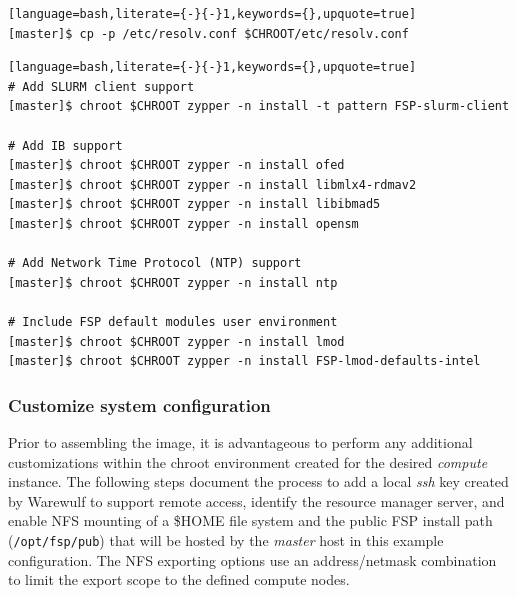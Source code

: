 \documentclass[letterpaper]{article}
\begin{document}
\begin{lstlisting}[language=bash,literate={-}{-}1,keywords={},upquote=true]
[master]$ cp -p /etc/resolv.conf $CHROOT/etc/resolv.conf
\end{lstlisting}


\begin{lstlisting}[language=bash,literate={-}{-}1,keywords={},upquote=true]
# Add SLURM client support
[master]$ chroot $CHROOT zypper -n install -t pattern FSP-slurm-client

# Add IB support
[master]$ chroot $CHROOT zypper -n install ofed
[master]$ chroot $CHROOT zypper -n install libmlx4-rdmav2
[master]$ chroot $CHROOT zypper -n install libibmad5
[master]$ chroot $CHROOT zypper -n install opensm

# Add Network Time Protocol (NTP) support
[master]$ chroot $CHROOT zypper -n install ntp

# Include FSP default modules user environment
[master]$ chroot $CHROOT zypper -n install lmod 
[master]$ chroot $CHROOT zypper -n install FSP-lmod-defaults-intel
\end{lstlisting}


\subsubsection{Customize system configuration} \label{sec:master_customization}

Prior to assembling the image, it is advantageous to perform any additional
customizations within the chroot environment created for the desired {\em
  compute} instance. The following steps document the process to add a local
{\em ssh} key created by Warewulf to support remote access, identify the
resource manager server, and enable NFS mounting of a \$HOME file system and
the public FSP install path (\texttt{/opt/fsp/pub}) that will be hosted by the
{\em master} host in this example configuration.  The NFS exporting options use
an address/netmask combination to limit the export scope to the defined compute nodes.

\end{document}
